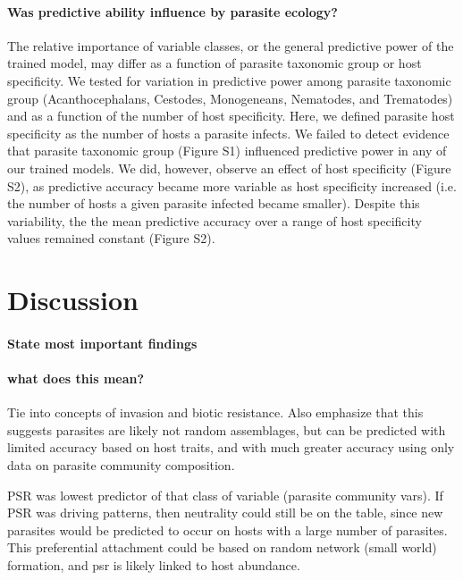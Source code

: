 \documentclass[12pt]{article}
\begin{document}
  
  \paragraph{Was predictive ability influence by parasite ecology?} 
  
  The relative importance of variable classes, or the general predictive power of the trained model, may differ as a function of parasite taxonomic group or host specificity. We tested for variation in predictive power among parasite taxonomic group (Acanthocephalans, Cestodes, Monogeneans, Nematodes, and Trematodes) and as a function of the number of host specificity. Here, we defined parasite host specificity as the number of hosts a parasite infects. We failed to detect evidence that parasite taxonomic group (Figure S1) influenced predictive power in any of our trained models. We did, however, observe an effect of host specificity (Figure S2), as predictive accuracy became more variable as host specificity increased (i.e. the number of hosts a given parasite infected became smaller). Despite this variability, the the mean predictive accuracy over a range of host specificity values remained constant (Figure S2).  
  
\section*{Discussion}
 
  \paragraph{State most important findings}
  
  
  
  
  
  \paragraph{what does this mean?}
  
  Tie into concepts of invasion and biotic resistance. Also emphasize that this suggests parasites are likely not random assemblages, but can be predicted with limited accuracy based on host traits, and with much greater accuracy using only data on parasite community composition. 
 
  PSR was lowest predictor of that class of variable (parasite community vars). If PSR was driving patterns, then neutrality could still be on the table, since new parasites would be predicted to occur on hosts with a large number of parasites. This preferential attachment could be based on random network (small world) formation, and psr is likely linked to host abundance. 
  
\end{document}
